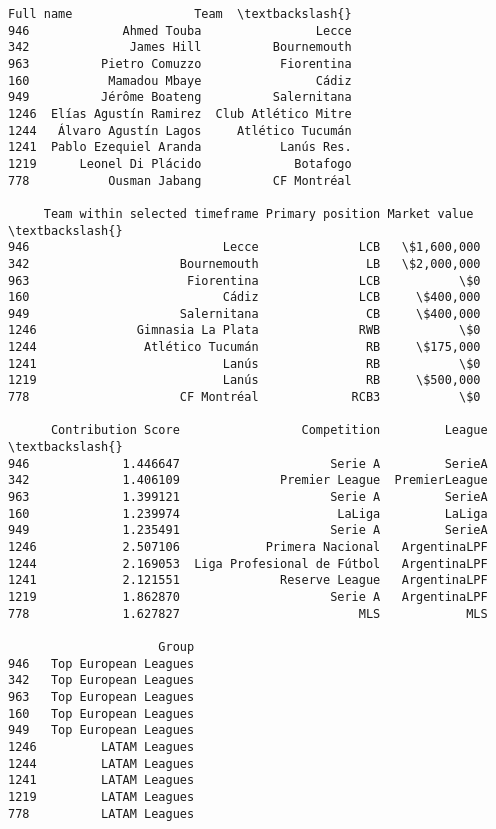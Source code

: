 \documentclass[11pt]{article}
\makeatletter
\newcommand{\boxspacing}{\kern\kvtcb@left@rule\kern\kvtcb@boxsep}
\newcommand{\prompt}[4]{
        {\ttfamily\llap{{\color{#2}[#3]:\hspace{3pt}#4}}\vspace{-\baselineskip}}
    }
\makeatother
\begin{document}
            \begin{tcolorbox}[breakable, size=fbox, boxrule=.5pt, pad at break*=1mm, opacityfill=0]
\prompt{Out}{outcolor}{49}{\boxspacing}
\begin{Verbatim}[commandchars=\\\{\}]
                  Full name                 Team  \textbackslash{}
946             Ahmed Touba                Lecce
342              James Hill          Bournemouth
963          Pietro Comuzzo           Fiorentina
160           Mamadou Mbaye                Cádiz
949          Jérôme Boateng          Salernitana
1246  Elías Agustín Ramirez  Club Atlético Mitre
1244   Álvaro Agustín Lagos     Atlético Tucumán
1241  Pablo Ezequiel Aranda           Lanús Res.
1219      Leonel Di Plácido             Botafogo
778           Ousman Jabang          CF Montréal

     Team within selected timeframe Primary position Market value  \textbackslash{}
946                           Lecce              LCB   \$1,600,000
342                     Bournemouth               LB   \$2,000,000
963                      Fiorentina              LCB           \$0
160                           Cádiz              LCB     \$400,000
949                     Salernitana               CB     \$400,000
1246              Gimnasia La Plata              RWB           \$0
1244               Atlético Tucumán               RB     \$175,000
1241                          Lanús               RB           \$0
1219                          Lanús               RB     \$500,000
778                     CF Montréal             RCB3           \$0

      Contribution Score                 Competition         League  \textbackslash{}
946             1.446647                     Serie A         SerieA
342             1.406109              Premier League  PremierLeague
963             1.399121                     Serie A         SerieA
160             1.239974                      LaLiga         LaLiga
949             1.235491                     Serie A         SerieA
1246            2.507106            Primera Nacional   ArgentinaLPF
1244            2.169053  Liga Profesional de Fútbol   ArgentinaLPF
1241            2.121551              Reserve League   ArgentinaLPF
1219            1.862870                     Serie A   ArgentinaLPF
778             1.627827                         MLS            MLS

                     Group
946   Top European Leagues
342   Top European Leagues
963   Top European Leagues
160   Top European Leagues
949   Top European Leagues
1246         LATAM Leagues
1244         LATAM Leagues
1241         LATAM Leagues
1219         LATAM Leagues
778          LATAM Leagues
\end{Verbatim}
\end{tcolorbox}
        
\end{document}

